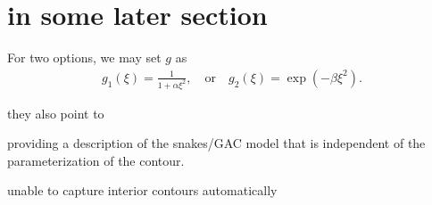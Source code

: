 \section{in some later section} 
For two options, we may set $g$ as
\begin{align*}
g_1(\xi) 
= \frac{1}{1 + \alpha\xi^2},
\quad\text{or}\quad 
g_2(\xi) 
= \exp(-\beta\xi^2).
\end{align*}


they also point to 

providing a description of the snakes/GAC model that is independent of the parameterization of the contour.

unable to capture interior contours automatically